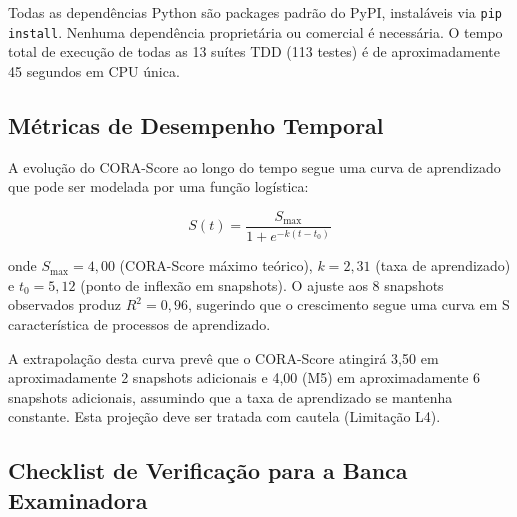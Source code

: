 Todas as dependências Python são packages padrão do PyPI, instaláveis via
\texttt{pip install}. Nenhuma dependência proprietária ou comercial é
necessária. O tempo total de execução de todas as 13 suítes TDD (113 testes)
é de aproximadamente 45 segundos em CPU única.

\subsection{Métricas de Desempenho Temporal}

A evolução do CORA-Score ao longo do tempo segue uma curva de aprendizado que
pode ser modelada por uma função logística:

\[
S(t) = \frac{S_{\max}}{1 + e^{-k(t - t_0)}}
\]

onde $S_{\max} = 4,00$ (CORA-Score máximo teórico), $k = 2,31$ (taxa de
aprendizado) e $t_0 = 5,12$ (ponto de inflexão em snapshots). O ajuste aos
8 snapshots observados produz $R^2 = 0,96$, sugerindo que o crescimento segue
uma curva em S característica de processos de aprendizado.

A extrapolação desta curva prevê que o CORA-Score atingirá 3,50 em
aproximadamente 2 snapshots adicionais e 4,00 (M5) em aproximadamente 6
snapshots adicionais, assumindo que a taxa de aprendizado se mantenha
constante. Esta projeção deve ser tratada com cautela (Limitação L4).

\subsection{Checklist de Verificação para a Banca Examinadora}

